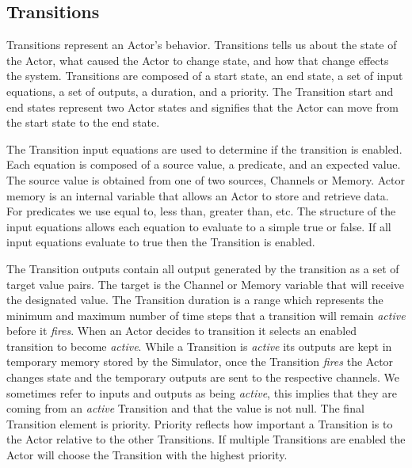 \subsection{Transitions}
Transitions represent an Actor's behavior.  Transitions tells us about the state of the Actor, what caused the Actor to change state, and how that change effects the system.  Transitions are composed of a start state, an end state, a set of input equations, a set of outputs, a duration, and a priority.  The Transition start and end states represent two Actor states and signifies that the Actor can move from the start state to the end state.  

The Transition input equations are used to determine if the transition is enabled.  Each equation is composed of a source value, a predicate, and an expected value.  The source value is obtained from one of two sources, Channels or Memory.  Actor memory is an internal variable that allows an Actor to store and retrieve data.  For predicates we use equal to, less than, greater than, etc.  The structure of the input equations allows each equation to evaluate to a simple true or false.  If all input equations evaluate to true then the Transition is enabled.  

The Transition outputs contain all output generated by the transition as a set of target value pairs.  The target is the Channel or Memory variable that will receive the designated value.  The Transition duration is a range which represents the minimum and maximum number of time steps that a transition will remain {\em active} before it {\em fires}.  When an Actor decides to transition it selects an enabled transition to become {\em active}.  While a Transition is {\em active} its outputs are kept in temporary memory stored by the Simulator, once the Transition {\em fires} the Actor changes state and the temporary outputs are sent to the respective channels.  We sometimes refer to inputs and outputs as being {\em active}, this implies that they are coming from an {\em active} Transition and that the value is not null.  The final Transition element is priority.  Priority reflects how important a Transition is to the Actor relative to the other Transitions.  If multiple Transitions are enabled the Actor will choose the Transition with the highest priority.

